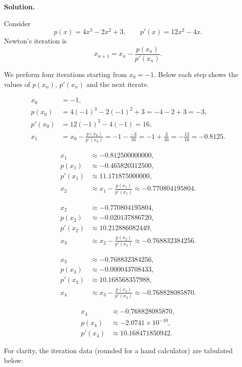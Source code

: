 \documentclass[a4paper]{article}
\begin{document}
\textbf{Solution.}

Consider
\[
p(x)=4x^3-2x^2+3,\qquad p'(x)=12x^2-4x.
\]
Newton's iteration is
\[
x_{n+1}=x_n-\frac{p(x_n)}{p'(x_n)}.
\]

We perform four iterations starting from \(x_0=-1\).  Below each step shows the values of \(p(x_n)\), \(p'(x_n)\) and the next iterate.

\[
\begin{aligned}
x_0 &= -1,\\
p(x_0) &= 4(-1)^3-2(-1)^2+3 = -4-2+3 = -3,\\
p'(x_0) &= 12(-1)^2-4(-1)=16,\\
x_1 &= x_0-\frac{p(x_0)}{p'(x_0)} = -1 -\frac{-3}{16} = -1+\frac{3}{16} = -\tfrac{13}{16} = -0.8125.
\end{aligned}
\]

\[
\begin{aligned}
x_1 &\approx -0.812500000000,\\
p(x_1) &\approx -0.465820312500,\\
p'(x_1) &\approx 11.171875000000,\\
x_2 &\approx x_1-\frac{p(x_1)}{p'(x_1)} \approx -0.770804195804.
\end{aligned}
\]

\[
\begin{aligned}
x_2 &\approx -0.770804195804,\\
p(x_2) &\approx -0.020137886720,\\
p'(x_2) &\approx 10.212886082449,\\
x_3 &\approx x_2-\frac{p(x_2)}{p'(x_2)} \approx -0.768832384256.
\end{aligned}
\]

\[
\begin{aligned}
x_3 &\approx -0.768832384256,\\
p(x_3) &\approx -0.000043708433,\\
p'(x_3) &\approx 10.168568357988,\\
x_4 &\approx x_3-\frac{p(x_3)}{p'(x_3)} \approx -0.768828085870.
\end{aligned}
\]

\[
\begin{aligned}
x_4 &\approx -0.768828085870,\\
p(x_4) &\approx -2.0741\times 10^{-10},\\
p'(x_4) &\approx 10.168471850942.
\end{aligned}
\]

For clarity, the iteration data (rounded for a hand calculator) are tabulated below:
\end{document}
